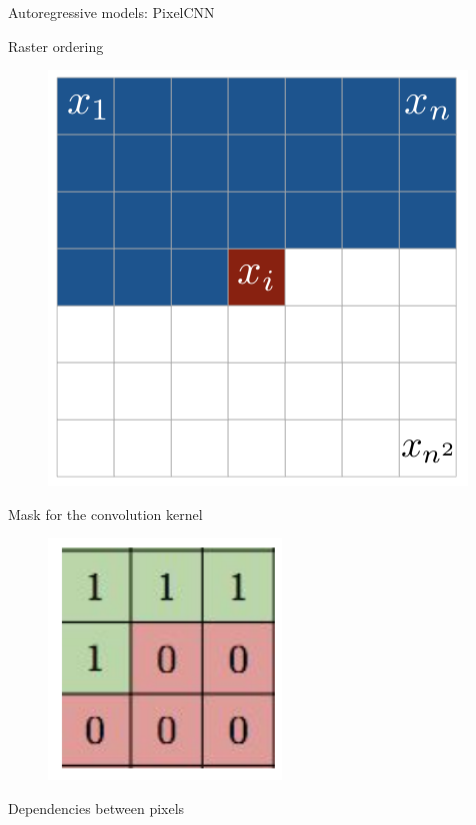 \begin{frame}{Autoregressive models: PixelCNN}
	\vspace{-0.2cm}
	\begin{minipage}[t]{0.5\columnwidth}
		\begin{block}{Raster ordering}
			\begin{figure}
				\centering
		        \includegraphics[width=0.7\linewidth]{figs/pixelcnn1.png}
			\end{figure}
		\end{block}
		\vspace{-0.5cm}
		\begin{block}{Mask for the convolution kernel}
			\begin{figure}
				\centering
		        \includegraphics[width=0.35\linewidth]{figs/pixelcnn_0_1.png}
			\end{figure}
		\end{block}
	\end{minipage}%
	\begin{minipage}[t]{0.5\columnwidth}
		\begin{block}{Dependencies between pixels}
			\begin{figure}
				\centering

\end{figure}
\end{block}
\end{minipage}
\end{frame}
